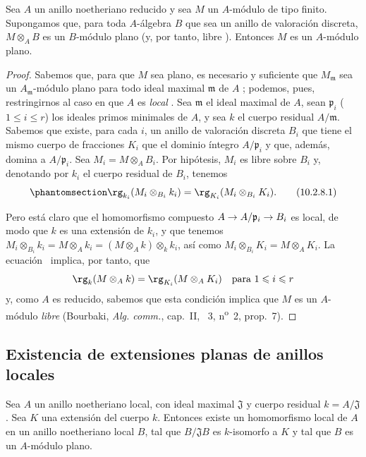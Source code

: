 \documentclass[oneside]{amsart}
\makeatletter
\renewcommand{\leq}{\leqslant}
\newcommand{\ega@arrow}[2]{\mathchoice{#1}{#2}{#2}{#2}}
\renewcommand{\to}{\ega@arrow{\longrightarrow}{\rightarrow}}
\let\EGAOriginalLabel\label
\renewcommand{\label}[1]{\phantomsection\EGAOriginalLabel{#1}}
\makeatother
\begin{document}
\begin{proposition}[10.2.8]
\label{0.10.2.8}
Sea $A$ un anillo noetheriano reducido y sea $M$ un $A$-módulo de tipo finito.
Supongamos que, para toda $A$-álgebra $B$ que sea un anillo de valoración discreta, $M\otimes_A B$ es un $B$-módulo plano (y, por tanto, libre ).
Entonces $M$ es un $A$-módulo plano.
\end{proposition}

\begin{proof}
Sabemos que, para que $M$ sea plano, es necesario y suficiente que $M_\mathfrak{m}$ sea un $A_\mathfrak{m}$-módulo plano para todo ideal maximal $\mathfrak{m}$ de $A$ ;
podemos, pues, restringirnos al caso en que $A$ es \emph{local} .
Sea $\mathfrak{m}$ el ideal maximal de $A$, sean $\mathfrak{p}_i$ ($1\leq i\leq r$) los ideales primos minimales de $A$, y sea $k$ el cuerpo residual $A/\mathfrak{m}$.
Sabemos  que existe, para cada $i$, un anillo de valoración discreta $B_i$ que tiene el mismo cuerpo de fracciones $K_i$ que el dominio íntegro $A/\mathfrak{p}_i$ y que, además, domina a $A/\mathfrak{p}_i$.
Sea $M_i=M\otimes_A B_i$.
Por hipótesis, $M_i$ es libre sobre $B_i$ y, denotando por $k_i$ el cuerpo residual de $B_i$, tenemos
\[
\label{0.10.2.8.1}
  \rg_{k_i}(M_i\otimes_{B_i}k_i)=\rg_{K_i}(M_i\otimes_{B_i}K_i).
  \tag{10.2.8.1}
\]

Pero está claro que el homomorfismo compuesto $A\to A/\mathfrak{p}_i\to B_i$ es local, de modo que $k$ es una extensión de $k_i$, y que tenemos $M_i\otimes_{B_i}k_i = M\otimes_A k_i = (M\otimes_A k)\otimes_k k_i$, así como $M_i\otimes_{B_i}K_i = M\otimes_A K_i$.
La ecuación~ implica, por tanto, que
\[
  \rg_k(M\otimes_A k)=\rg_{K_i}(M\otimes_A K_i)\quad\mbox{para $1\leq i\leq r$}
\]
y, como $A$ es reducido, sabemos que esta condición implica que $M$ es un $A$-módulo \emph{libre} (Bourbaki, \emph{Alg. comm.}, cap.~II, \textsection~3, n\textsuperscript{o}~2, prop.~7).
\end{proof}

\subsection{Existencia de extensiones planas de anillos locales}
\label{subsection:0.10.3}

\begin{proposition}[10.3.1]
\label{0.10.3.1}
Sea $A$ un anillo noetheriano local, con ideal maximal $\mathfrak{J}$ y cuerpo residual $k=A/\mathfrak{J}$.
Sea $K$ una extensión del cuerpo $k$.
Entonces existe un homomorfismo local de $A$ en un anillo noetheriano local $B$, tal que $B/\mathfrak{J}B$ es $k$-isomorfo a $K$ y tal que $B$ es un $A$-módulo plano.
\end{proposition}
\end{document}
